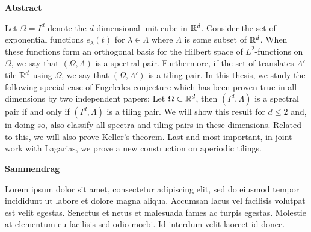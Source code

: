 





\begin{center}\textsf{\textbf{\large Abstract}}\end{center} 

Let $\Omega=I^d$ denote the $d$-dimensional unit cube in $\mathbb{R}^d$. Consider the set of exponential functions $e_\lambda(t)$ for $\lambda \in \Lambda$ where $\Lambda$ is some subset of $\mathbb{R}^d$. When these functions form an orthogonal basis for the Hilbert space of $L^2$-functions on $\Omega$, we say that $(\Omega,\Lambda)$ is a spectral pair. Furthermore, if the set of translates $\Lambda'$ tile $\mathbb{R}^d$ using $\Omega$, we say that $(\Omega,\Lambda')$ is a tiling pair. In this thesis, we study the following special case of Fugeledes conjecture which has been proven true in all dimensions by two independent papers: Let $\Omega\subset\mathbb{R}^d$, then $(I^d,\Lambda)$ is a spectral pair if and only if $(I^d,\Lambda)$ is a tiling pair. We will show this result for $d\leq2$ and, in doing so, also classify all spectra and tiling pairs in these dimensions. Related to this, we will also prove Keller's theorem. Last and most important, in joint work with Lagarias, we prove a new construction on aperiodic tilings. 

\begin{center}\textsf{\textbf{\large Sammendrag}}\end{center} 

Lorem ipsum dolor sit amet, consectetur adipiscing elit, sed do eiusmod tempor incididunt ut labore et dolore magna aliqua. Accumsan lacus vel facilisis volutpat est velit egestas. Senectus et netus et malesuada fames ac turpis egestas. Molestie at elementum eu facilisis sed odio morbi. Id interdum velit laoreet id donec.


 